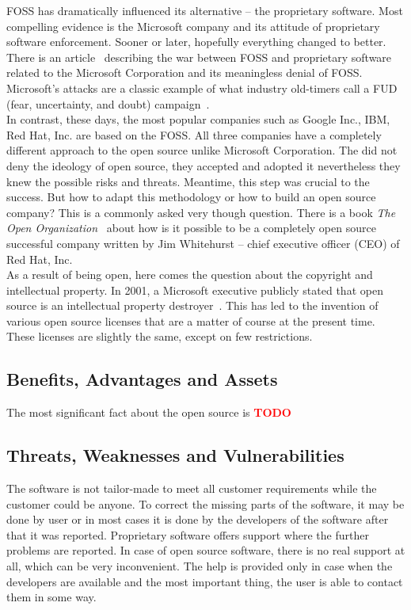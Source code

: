\documentclass[12pt,a4paper]{article}
\newcommand{\TODO}{\textbf{\textcolor{red}{TODO}}} %
\theoremstyle{definition}
\begin{document}
    FOSS has dramatically influenced its alternative -- the proprietary software. Most compelling evidence is the Microsoft company and its attitude of proprietary software enforcement. Sooner or later, hopefully everything changed to better. There is an article~\cite{938720} describing the war between FOSS and proprietary software related to the Microsoft Corporation and its meaningless denial of FOSS. Microsoft's attacks are a classic example of what industry old-timers call a FUD (fear, uncertainty, and doubt) campaign~\cite{938720}.\\

    In contrast, these days, the most popular companies such as Google Inc., IBM, Red Hat, Inc. are based on the FOSS. All three companies have a completely different approach to the open source unlike Microsoft Corporation. The did not deny the ideology of open source, they accepted and adopted it nevertheless they knew the possible risks and threats. Meantime, this step was crucial to the success. But how to adapt this methodology or how to build an open source company? This is a commonly asked very though question. There is a book \textit{The Open Organization}~\cite{whitehurst2015open} about how is it possible to be a completely open source successful company written by Jim Whitehurst -- chief executive officer (CEO) of Red Hat, Inc.\\

    As a result of being open, here comes the question about the copyright and intellectual property. In 2001, a Microsoft executive publicly stated that open source is an intellectual property destroyer~\cite{5662568}. This has led to the invention of various open source licenses that are a matter of course at the present time. These licenses are slightly the same, except on few restrictions.

    \subsection{Benefits, Advantages and Assets}

        The most significant fact about the open source is \TODO

    \subsection{Threats, Weaknesses and Vulnerabilities}

        The software is not tailor-made to meet all customer requirements while the customer could be anyone. To correct the missing parts of the software, it may be done by user or in most cases it is done by the developers of the software after that it was reported. Proprietary software offers support where the further problems are reported. In case of open source software, there is no real support at all, which can be very inconvenient. The help is provided only in case when the developers are available and the most important thing, the user is able to contact them in some way.\\
\end{document}
